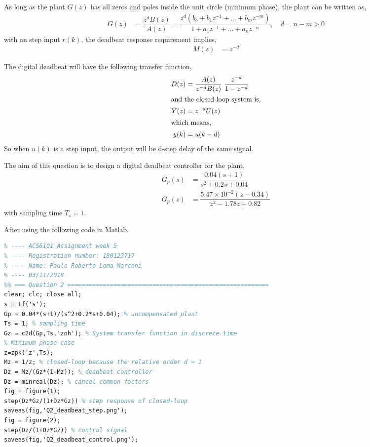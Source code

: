 \documentclass[11pt, a4paper]{article}
\begin{document}
As long as the plant $G(z)$ has all zeros and poles inside the unit circle (minimum phase), the plant can be written as,
\begin{align*}
G(z) &= \dfrac{z^{d} B(z)}{A(z)} = \dfrac{z^{d}(b_o + b_1 z^{-1}+...+b_m z^{-m})}{1+a_1 z^{-1} + ... + a_n z^{-n}}, \quad d=n-m>0
\end{align*}
with an step input $r(k)$, the deadbeat response requirement implies,
\begin{align*}
	M(z) &= z^{-d}
\end{align*} 

The digital deadbeat will have the following transfer function,
\begin{align}
D(z) &= \dfrac{A(z)}{z^{-d}B(z)}~\dfrac{z^{-d}}{1-z^{-d}}\\
\intertext{and the closed-loop system is,}
Y(z) &= z^{-d} U(z) \nonumber \\
\intertext{which means,}
y(k) &= u(k-d) \nonumber
\end{align}
So when $u(k)$ is a step input, the output will be d-step delay of the same signal.


The aim of this question is to design a digital deadbeat controller for the plant,
\begin{align*}
G_p(s) &= \dfrac{0.04(s+1)}{s^2+0.2s+0.04} \\
G_p(z) &= \dfrac{5.47\times 10^{-2}(z-0.34)}{z^2 - 1.78z + 0.82}
\end{align*}
with sampling time $T_s=1$.

After using the following code in Matlab.
\begin{lstlisting}[language=tex, caption={}, label={}]
%% ========================================================================
% ---- ACS6101 Assignment week 5
% ---- Registration number: 180123717
% ---- Name: Paulo Roberto Loma Marconi
% ---- 03/11/2018
%% === Question 2 =========================================================
clear; clc; close all;
s = tf('s');
Gp = 0.04*(s+1)/(s^2+0.2*s+0.04); % uncompensated plant
Ts = 1; % sampling time
Gz = c2d(Gp,Ts,'zoh'); % System transfer function in discrete time
% Minimum phase case
z=zpk('z',Ts);
Mz = 1/z; % closed-loop because the relative order d = 1
Dz = Mz/(Gz*(1-Mz)); % deadbeat controller
Dz = minreal(Dz); % cancel common factors
fig = figure(1); 
step(Dz*Gz/(1+Dz*Gz)) % step response of closed-loop
saveas(fig,'Q2_deadbeat_step.png');
fig = figure(2); 
step(Dz/(1+Dz*Gz)) % control signal
saveas(fig,'Q2_deadbeat_control.png');
\end{lstlisting}
\end{document}

